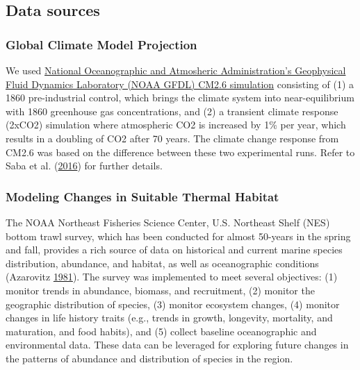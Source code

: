 \documentclass[
]{book}
\begin{document}
\hypertarget{data-sources-42}{%
\subsection{Data sources}\label{data-sources-42}}

\hypertarget{global-climate-model-projection}{%
\subsubsection{Global Climate Model Projection}\label{global-climate-model-projection}}

We used \href{https://www.gfdl.noaa.gov/high-resolution-climate-modeling/}{National Oceanographic and Atmosheric Administration's Geophysical Fluid Dynamics Laboratory (NOAA GFDL) CM2.6 simulation} consisting of (1) a 1860 pre-industrial control, which brings the climate system into near-equilibrium with 1860 greenhouse gas concentrations, and (2) a transient climate response (2xCO2) simulation where atmospheric CO2 is increased by 1\% per year, which results in a doubling of CO2 after 70 years. The climate change response from CM2.6 was based on the difference between these two experimental runs. Refer to Saba et al. (\protect\hyperlink{ref-Saba2016}{2016}) for further details.

\hypertarget{modeling-changes-in-suitable-thermal-habitat}{%
\subsubsection{Modeling Changes in Suitable Thermal Habitat}\label{modeling-changes-in-suitable-thermal-habitat}}

The NOAA Northeast Fisheries Science Center, U.S. Northeast Shelf (NES) bottom trawl survey, which has been conducted for almost 50-years in the spring and fall, provides a rich source of data on historical and current marine species distribution, abundance, and habitat, as well as oceanographic conditions (Azarovitz \protect\hyperlink{ref-Azarovitz1981}{1981}). The survey was implemented to meet several objectives: (1) monitor trends in abundance, biomass, and recruitment, (2) monitor the geographic distribution of species, (3) monitor ecosystem changes, (4) monitor changes in life history traits (e.g., trends in growth, longevity, mortality, and maturation, and food habits), and (5) collect baseline oceanographic and environmental data. These data can be leveraged for exploring future changes in the patterns of abundance and distribution of species in the region.
\end{document}
